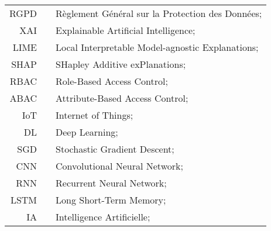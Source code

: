 \begin{center}
	\begin{tabular}[t]{rp{5mm}p{12cm}}
		RGPD & & Règlement Général sur la Protection des Données; \\
		XAI & & Explainable Artificial Intelligence; \\
            LIME & & Local Interpretable Model-agnostic Explanations; \\
            SHAP & & SHapley Additive exPlanations; \\
            RBAC & & Role-Based Access Control; \\
            ABAC & & Attribute-Based Access Control; \\
            IoT & & Internet of Things; \\
            DL & & Deep Learning; \\
            SGD & & Stochastic Gradient Descent; \\
            CNN & & Convolutional Neural Network; \\
            RNN & & Recurrent Neural Network; \\
            LSTM & & Long Short-Term Memory; \\
            IA & & Intelligence Artificielle; \\
	\end{tabular}
\end{center}
